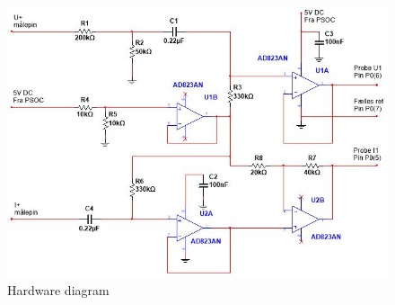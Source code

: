 \begin{figure}[H] %
	\centering
	\includegraphics[width=\textwidth]{Figure/MaalHardware}
	\caption{Hardware diagram}
	\label{fig:MaalDiagram}
\end{figure}

